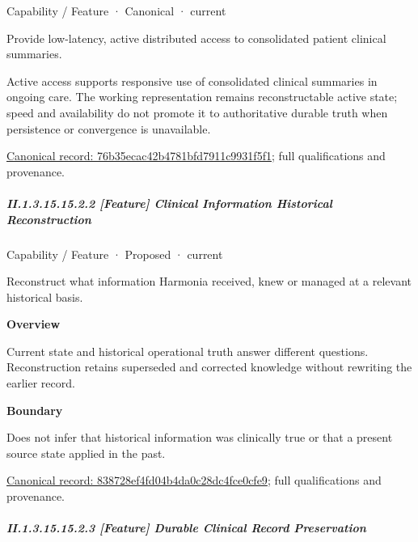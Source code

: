 \label{element:76b35ecac42b4781bfd7911c9931f5f1}
{\small Capability / Feature · Canonical · current}\par

Provide low-latency, active distributed access to consolidated patient clinical summaries.



Active access supports responsive use of consolidated clinical summaries in ongoing care. The working representation remains reconstructable active state; speed and availability do not promote it to authoritative durable truth when persistence or convergence is unavailable.


{\footnotesize \href{../../../../continuum/strategy/capability/feature/76b35ecac42b4781bfd7911c9931f5f1.md}{Canonical record: 76b35ecac42b4781bfd7911c9931f5f1}; full qualifications and provenance.}\par
\subparagraph*{II.1.3.15.15.2.2 [Feature] Clinical Information Historical Reconstruction}
\label{navigation:II.1.3.15.15.2.2}

\label{element:838728ef4fd04b4da0c28dc4fce0cfe9}
{\small Capability / Feature · Proposed · current}\par

Reconstruct what information Harmonia received, knew or managed at a relevant historical basis.



\textbf{Overview}



Current state and historical operational truth answer different questions. Reconstruction retains superseded and corrected knowledge without rewriting the earlier record.



\textbf{Boundary}



Does not infer that historical information was clinically true or that a present source state applied in the past.


{\footnotesize \href{../../../../continuum/strategy/capability/feature/838728ef4fd04b4da0c28dc4fce0cfe9.md}{Canonical record: 838728ef4fd04b4da0c28dc4fce0cfe9}; full qualifications and provenance.}\par
\subparagraph*{II.1.3.15.15.2.3 [Feature] Durable Clinical Record Preservation}
\label{navigation:II.1.3.15.15.2.3}

